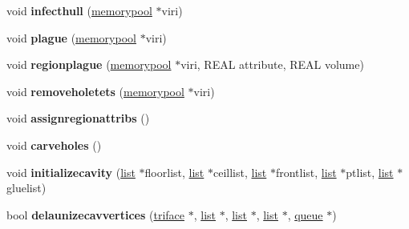 \begin{DoxyCompactItemize}
\item 
\hypertarget{classtetgenmesh_ab3acadb073b7cc0daf67fdaf308d28ea}{void {\bfseries infecthull} (\hyperlink{classtetgenmesh_1_1memorypool}{memorypool} $\ast$viri)}\label{classtetgenmesh_ab3acadb073b7cc0daf67fdaf308d28ea}

\item 
\hypertarget{classtetgenmesh_aeface135bf1b24cea99302c307354dbd}{void {\bfseries plague} (\hyperlink{classtetgenmesh_1_1memorypool}{memorypool} $\ast$viri)}\label{classtetgenmesh_aeface135bf1b24cea99302c307354dbd}

\item 
\hypertarget{classtetgenmesh_a629d12945a23e7bc35e41d3f8e733ff0}{void {\bfseries regionplague} (\hyperlink{classtetgenmesh_1_1memorypool}{memorypool} $\ast$viri, R\-E\-A\-L attribute, R\-E\-A\-L volume)}\label{classtetgenmesh_a629d12945a23e7bc35e41d3f8e733ff0}

\item 
\hypertarget{classtetgenmesh_a06dfdc12ee845473eda0f2a05a04e51c}{void {\bfseries removeholetets} (\hyperlink{classtetgenmesh_1_1memorypool}{memorypool} $\ast$viri)}\label{classtetgenmesh_a06dfdc12ee845473eda0f2a05a04e51c}

\item 
\hypertarget{classtetgenmesh_a789190ca4c7c677c07474f8489a4235c}{void {\bfseries assignregionattribs} ()}\label{classtetgenmesh_a789190ca4c7c677c07474f8489a4235c}

\item 
\hypertarget{classtetgenmesh_ad71017c71bd2cac0232c410a651ed085}{void {\bfseries carveholes} ()}\label{classtetgenmesh_ad71017c71bd2cac0232c410a651ed085}

\item 
\hypertarget{classtetgenmesh_a68f394701d1846f81e8504d6ea2964b8}{void {\bfseries initializecavity} (\hyperlink{classtetgenmesh_1_1list}{list} $\ast$floorlist, \hyperlink{classtetgenmesh_1_1list}{list} $\ast$ceillist, \hyperlink{classtetgenmesh_1_1list}{list} $\ast$frontlist, \hyperlink{classtetgenmesh_1_1list}{list} $\ast$ptlist, \hyperlink{classtetgenmesh_1_1list}{list} $\ast$gluelist)}\label{classtetgenmesh_a68f394701d1846f81e8504d6ea2964b8}

\item 
\hypertarget{classtetgenmesh_aedfc3798059c4a8cc504ffe6fdb463e8}{bool {\bfseries delaunizecavvertices} (\hyperlink{classtetgenmesh_1_1triface}{triface} $\ast$, \hyperlink{classtetgenmesh_1_1list}{list} $\ast$, \hyperlink{classtetgenmesh_1_1list}{list} $\ast$, \hyperlink{classtetgenmesh_1_1list}{list} $\ast$, \hyperlink{classtetgenmesh_1_1queue}{queue} $\ast$)}\label{classtetgenmesh_aedfc3798059c4a8cc504ffe6fdb463e8}


\end{DoxyCompactItemize}
